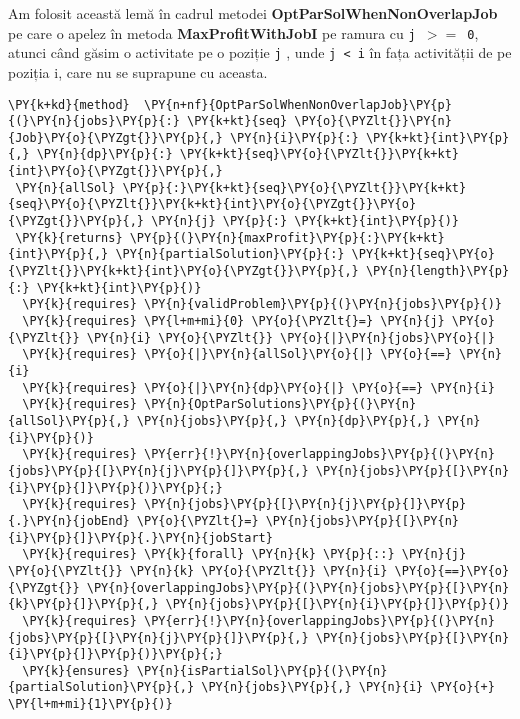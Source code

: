 Am folosit această lemă în cadrul metodei \textbf{OptParSolWhenNonOverlapJob} pe care o apelez în metoda \textbf{MaxProfitWithJobI}  pe ramura cu \texttt{j $>=$ 0}, atunci când găsim o activitate pe o poziție \texttt{j} , unde \texttt{j < i} în fața activității de pe poziția i, care nu se suprapune cu aceasta.
\begin{footnotesize}
\begin{Verbatim}[commandchars=\\\{\}, fontsize=\footnotesize]
\PY{k+kd}{method}  \PY{n+nf}{OptParSolWhenNonOverlapJob}\PY{p}{(}\PY{n}{jobs}\PY{p}{:} \PY{k+kt}{seq} \PY{o}{\PYZlt{}}\PY{n}{Job}\PY{o}{\PYZgt{}}\PY{p}{,} \PY{n}{i}\PY{p}{:} \PY{k+kt}{int}\PY{p}{,} \PY{n}{dp}\PY{p}{:} \PY{k+kt}{seq}\PY{o}{\PYZlt{}}\PY{k+kt}{int}\PY{o}{\PYZgt{}}\PY{p}{,}
 \PY{n}{allSol} \PY{p}{:}\PY{k+kt}{seq}\PY{o}{\PYZlt{}}\PY{k+kt}{seq}\PY{o}{\PYZlt{}}\PY{k+kt}{int}\PY{o}{\PYZgt{}}\PY{o}{\PYZgt{}}\PY{p}{,} \PY{n}{j} \PY{p}{:} \PY{k+kt}{int}\PY{p}{)}
 \PY{k}{returns} \PY{p}{(}\PY{n}{maxProfit}\PY{p}{:}\PY{k+kt}{int}\PY{p}{,} \PY{n}{partialSolution}\PY{p}{:} \PY{k+kt}{seq}\PY{o}{\PYZlt{}}\PY{k+kt}{int}\PY{o}{\PYZgt{}}\PY{p}{,} \PY{n}{length}\PY{p}{:} \PY{k+kt}{int}\PY{p}{)}
  \PY{k}{requires} \PY{n}{validProblem}\PY{p}{(}\PY{n}{jobs}\PY{p}{)}
  \PY{k}{requires} \PY{l+m+mi}{0} \PY{o}{\PYZlt{}=} \PY{n}{j} \PY{o}{\PYZlt{}} \PY{n}{i} \PY{o}{\PYZlt{}} \PY{o}{|}\PY{n}{jobs}\PY{o}{|}
  \PY{k}{requires} \PY{o}{|}\PY{n}{allSol}\PY{o}{|} \PY{o}{==} \PY{n}{i}
  \PY{k}{requires} \PY{o}{|}\PY{n}{dp}\PY{o}{|} \PY{o}{==} \PY{n}{i}
  \PY{k}{requires} \PY{n}{OptParSolutions}\PY{p}{(}\PY{n}{allSol}\PY{p}{,} \PY{n}{jobs}\PY{p}{,} \PY{n}{dp}\PY{p}{,} \PY{n}{i}\PY{p}{)}
  \PY{k}{requires} \PY{err}{!}\PY{n}{overlappingJobs}\PY{p}{(}\PY{n}{jobs}\PY{p}{[}\PY{n}{j}\PY{p}{]}\PY{p}{,} \PY{n}{jobs}\PY{p}{[}\PY{n}{i}\PY{p}{]}\PY{p}{)}\PY{p}{;}
  \PY{k}{requires} \PY{n}{jobs}\PY{p}{[}\PY{n}{j}\PY{p}{]}\PY{p}{.}\PY{n}{jobEnd} \PY{o}{\PYZlt{}=} \PY{n}{jobs}\PY{p}{[}\PY{n}{i}\PY{p}{]}\PY{p}{.}\PY{n}{jobStart}
  \PY{k}{requires} \PY{k}{forall} \PY{n}{k} \PY{p}{::} \PY{n}{j} \PY{o}{\PYZlt{}} \PY{n}{k} \PY{o}{\PYZlt{}} \PY{n}{i} \PY{o}{==}\PY{o}{\PYZgt{}} \PY{n}{overlappingJobs}\PY{p}{(}\PY{n}{jobs}\PY{p}{[}\PY{n}{k}\PY{p}{]}\PY{p}{,} \PY{n}{jobs}\PY{p}{[}\PY{n}{i}\PY{p}{]}\PY{p}{)} 
  \PY{k}{requires} \PY{err}{!}\PY{n}{overlappingJobs}\PY{p}{(}\PY{n}{jobs}\PY{p}{[}\PY{n}{j}\PY{p}{]}\PY{p}{,} \PY{n}{jobs}\PY{p}{[}\PY{n}{i}\PY{p}{]}\PY{p}{)}\PY{p}{;}
  \PY{k}{ensures} \PY{n}{isPartialSol}\PY{p}{(}\PY{n}{partialSolution}\PY{p}{,} \PY{n}{jobs}\PY{p}{,} \PY{n}{i} \PY{o}{+} \PY{l+m+mi}{1}\PY{p}{)}

\end{Verbatim}
\end{footnotesize}
